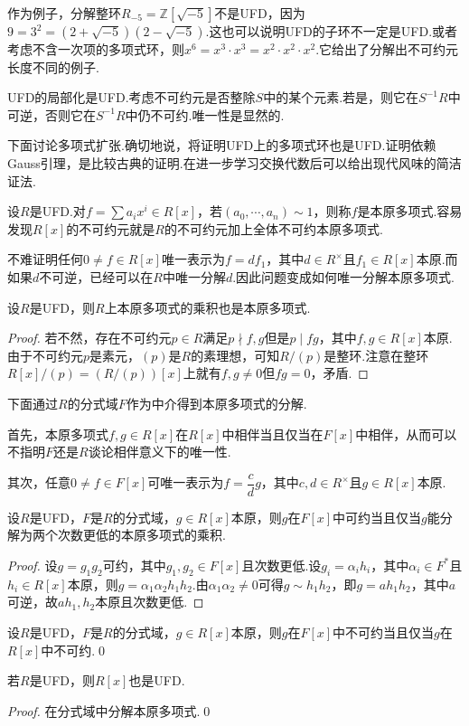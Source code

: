 作为例子，分解整环$R_{-5}=\mathbb{Z}[\sqrt{-5}]$不是UFD，因为$9=3^2=(2+\sqrt{-5})(2-\sqrt{-5})$.这也可以说明UFD的子环不一定是UFD.或者考虑不含一次项的多项式环，则$x^6=x^3\cdot x^3=x^2\cdot x^2\cdot x^2$.它给出了分解出不可约元长度不同的例子.
\begin{remark}
    UFD的局部化是UFD.考虑不可约元是否整除$S$中的某个元素.若是，则它在$S^{-1}R$中可逆，否则它在$S^{-1}R$中仍不可约.唯一性是显然的.
\end{remark}

下面讨论多项式扩张.确切地说，将证明UFD上的多项式环也是UFD.证明依赖Gauss引理，是比较古典的证明.在进一步学习交换代数后可以给出现代风味的简洁证法.

\medskip 设$R$是UFD.对$f=\sum a_ix^i\in R[x]$，若$(a_0,\cdots,a_n)\sim 1$，则称$f$是{\heiti 本原多项式}.容易发现$R[x]$的不可约元就是$R$的不可约元加上全体不可约本原多项式.

不难证明任何$0\ne f\in R[x]$唯一表示为$f=df_1$，其中$d\in R^\times$且$f_1\in R[x]$本原.而如果$d$不可逆，已经可以在$R$中唯一分解$d$.因此问题变成如何唯一分解本原多项式.
\begin{lemma*}[(Gauss)]
    设$R$是UFD，则$R$上本原多项式的乘积也是本原多项式.
\end{lemma*}
\begin{proof}
    若不然，存在不可约元$p\in R$满足$p\nmid f,g$但是$p\mid fg$，其中$f,g\in R[x]$本原.由于不可约元$p$是素元，$(p)$是$R$的素理想，可知$R/(p)$是整环.注意在整环$R[x]/(p)=(R/(p))[x]$上就有$f,g\ne 0$但$fg=0$，矛盾.
\end{proof}

下面通过$R$的分式域$F$作为中介得到本原多项式的分解.

首先，本原多项式$f,g\in R[x]$在$R[x]$中相伴当且仅当在$F[x]$中相伴，从而可以不指明$F$还是$R$谈论相伴意义下的唯一性.

其次，任意$0\ne f\in F[x]$可唯一表示为$f=\dfrac{c}{d}g$，其中$c,d\in R^\times$且$g\in R[x]$本原.

\begin{lemma*}
    设$R$是UFD，$F$是$R$的分式域，$g\in R[x]$本原，则$g$在$F[x]$中可约当且仅当$g$能分解为两个次数更低的本原多项式的乘积.
\end{lemma*}
\begin{proof}
    设$g=g_1g_2$可约，其中$g_1,g_2\in F[x]$且次数更低.设$g_i=\alpha_i h_i$，其中$\alpha_i\in F^*$且$h_i\in R[x]$本原，则$g=\alpha_1\alpha_2 h_1h_2$.由$\alpha_1\alpha_2\ne 0$可得$g\sim h_1h_2$，即$g=ah_1h_2$，其中$a$可逆，故$ah_1,h_2$本原且次数更低.
\end{proof}
\begin{cor*}
    设$R$是UFD，$F$是$R$的分式域，$g\in R[x]$本原，则$g$在$F[x]$中不可约当且仅当$g$在$R[x]$中不可约.\qed
\end{cor*}
\begin{thm}
    若$R$是UFD，则$R[x]$也是UFD.
\end{thm}
\begin{proof}
    在分式域中分解本原多项式.\qed
\end{proof}

